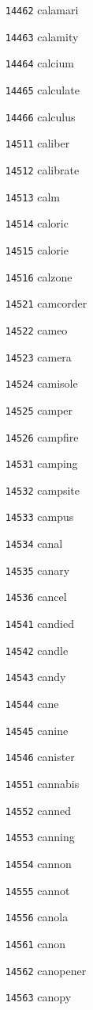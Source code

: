 \documentclass[twoside,11pt]{article}
\begin{document}
\begin{multicols}{5}
\begin{enumerate}
\item[\texttt{14462}] calamari
\item[\texttt{14463}] calamity
\item[\texttt{14464}] calcium
\item[\texttt{14465}] calculate
\item[\texttt{14466}] calculus
\item[\texttt{14511}] caliber
\item[\texttt{14512}] calibrate
\item[\texttt{14513}] calm
\item[\texttt{14514}] caloric
\item[\texttt{14515}] calorie
\item[\texttt{14516}] calzone
\item[\texttt{14521}] camcorder
\item[\texttt{14522}] cameo
\item[\texttt{14523}] camera
\item[\texttt{14524}] camisole
\item[\texttt{14525}] camper
\item[\texttt{14526}] campfire
\item[\texttt{14531}] camping
\item[\texttt{14532}] campsite
\item[\texttt{14533}] campus
\item[\texttt{14534}] canal
\item[\texttt{14535}] canary
\item[\texttt{14536}] cancel
\item[\texttt{14541}] candied
\item[\texttt{14542}] candle
\item[\texttt{14543}] candy
\item[\texttt{14544}] cane
\item[\texttt{14545}] canine
\item[\texttt{14546}] canister
\item[\texttt{14551}] cannabis
\item[\texttt{14552}] canned
\item[\texttt{14553}] canning
\item[\texttt{14554}] cannon
\item[\texttt{14555}] cannot
\item[\texttt{14556}] canola
\item[\texttt{14561}] canon
\item[\texttt{14562}] canopener
\item[\texttt{14563}] canopy

\end{enumerate}
\end{multicols}
\end{document}

